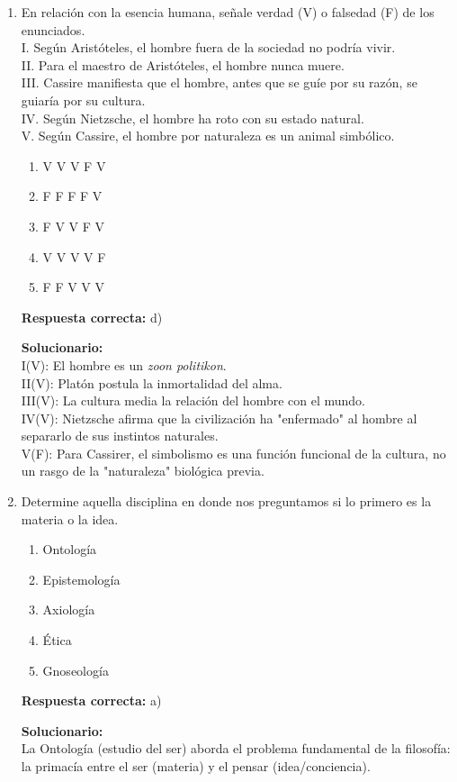 \begin{enumerate}
	\item En relación con la esencia humana, señale verdad (V) o falsedad (F) de los enunciados.\\
	I. Según Aristóteles, el hombre fuera de la sociedad no podría vivir.\\
	II. Para el maestro de Aristóteles, el hombre nunca muere.\\
	III. Cassire manifiesta que el hombre, antes que se guíe por su razón, se guiaría por su cultura.\\
	IV. Según Nietzsche, el hombre ha roto con su estado natural.\\
	V. Según Cassire, el hombre por naturaleza es un animal simbólico.
	\begin{enumerate}[label=\alph*)]
		\item V V V F V
		\item F F F F V
		\item F V V F V
		\item V V V V F
		\item F F V V V
	\end{enumerate}
	\textbf{Respuesta correcta:} d)
	
	\vspace{2mm}
	\textbf{Solucionario:}\\
	I(V): El hombre es un \textit{zoon politikon}. \\
	II(V): Platón postula la inmortalidad del alma. \\
	III(V): La cultura media la relación del hombre con el mundo. \\
	IV(V): Nietzsche afirma que la civilización ha "enfermado" al hombre al separarlo de sus instintos naturales.\\ 
	V(F): Para Cassirer, el simbolismo es una función funcional de la cultura, no un rasgo de la "naturaleza" biológica previa.\\
	
	\vspace{6mm}
	
	\item Determine aquella disciplina en donde nos preguntamos si lo primero es la materia o la idea.
	\begin{enumerate}[label=\alph*)]
		\item Ontología
		\item Epistemología
		\item Axiología
		\item Ética
		\item Gnoseología
	\end{enumerate}
	\textbf{Respuesta correcta:} a)
	
	\vspace{2mm}
	\textbf{Solucionario:}\\
	La Ontología (estudio del ser) aborda el problema fundamental de la filosofía: la primacía entre el ser (materia) y el pensar (idea/conciencia).
	
	\vspace{6mm}
\end{enumerate}




